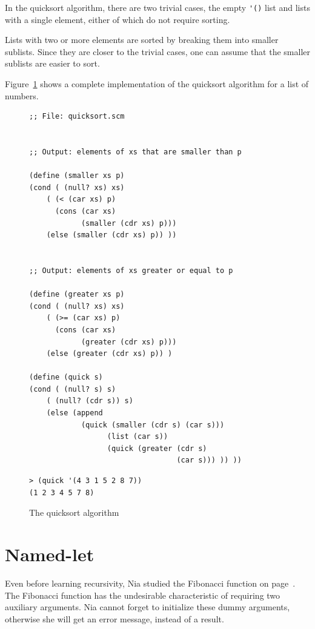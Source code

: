 \documentclass[a4paper,12pt]{book}
\newenvironment{fmpage}[1]
           {\begin{lrbox}{\fmbox}\begin{minipage}{#1}}
           {\end{minipage}\end{lrbox}\fbox{\usebox{\fmbox}}}
\begin{document}
In the quicksort algorithm,
there are two trivial cases,
the empty \verb|'()| list
and lists with a single element,
either of which
do not require sorting.

Lists with two or more elements
are sorted by breaking them into
smaller sublists. Since they are
closer to the trivial cases,
one can assume that the smaller sublists
are easier to sort.

Figure~\ref{quicksort} shows a complete
implementation of the quicksort algorithm
for a list of numbers.

\begin{figure}[!h]
\begin{fmpage}{0.9\linewidth}
\begin{verbatim}
;; File: quicksort.scm


;; Output: elements of xs that are smaller than p

(define (smaller xs p)
(cond ( (null? xs) xs)
    ( (< (car xs) p)
      (cons (car xs)
            (smaller (cdr xs) p)))
    (else (smaller (cdr xs) p)) ))


;; Output: elements of xs greater or equal to p

(define (greater xs p)
(cond ( (null? xs) xs)
    ( (>= (car xs) p)
      (cons (car xs)
            (greater (cdr xs) p)))
    (else (greater (cdr xs) p)) ) 

(define (quick s)
(cond ( (null? s) s)
    ( (null? (cdr s)) s)
    (else (append 
            (quick (smaller (cdr s) (car s)))
                  (list (car s))
                  (quick (greater (cdr s)
                                  (car s))) )) ))

\end{verbatim}
\end{fmpage}

\begin{fmpage}{0.9\linewidth}
\begin{verbatim}
> (quick '(4 3 1 5 2 8 7))
(1 2 3 4 5 7 8)
\end{verbatim}
\end{fmpage}
\caption{The quicksort algorithm}
\label{quicksort}
\end{figure}

\section{Named-let}

Even before learning recursivity,
Nia studied the Fibonacci
function on page~\pageref{page:Fibonacci}.
The Fibonacci function has the
undesirable characteristic of
requiring two auxiliary arguments.
Nia cannot forget to initialize
these dummy arguments, otherwise
she will get an error message,
instead of a result. 
\end{document}
